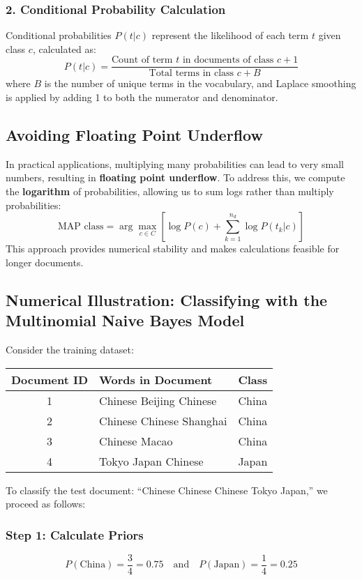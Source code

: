 \documentclass{article}
\begin{document}
\subsubsection*{2. Conditional Probability Calculation}
Conditional probabilities \( P(t|c) \) represent the likelihood of each term \( t \) given class \( c \), calculated as:
\[
P(t|c) = \frac{\text{Count of term } t \text{ in documents of class } c + 1}{\text{Total terms in class } c + B}
\]
where \( B \) is the number of unique terms in the vocabulary, and Laplace smoothing is applied by adding 1 to both the numerator and denominator.

\subsection*{Avoiding Floating Point Underflow}
In practical applications, multiplying many probabilities can lead to very small numbers, resulting in \textbf{floating point underflow}. To address this, we compute the \textbf{logarithm} of probabilities, allowing us to sum logs rather than multiply probabilities:
\[
\text{MAP class} = \arg \max_{c \in C} \left[ \log P(c) + \sum_{k=1}^{n_d} \log P(t_k|c) \right]
\]
This approach provides numerical stability and makes calculations feasible for longer documents.

\subsection*{Numerical Illustration: Classifying with the Multinomial Naive Bayes Model}

Consider the training dataset:

\begin{table}[h]
\centering
\begin{tabular}{|c|l|c|}
\hline
\textbf{Document ID} & \textbf{Words in Document} & \textbf{Class} \\
\hline
1 & Chinese Beijing Chinese & China \\
2 & Chinese Chinese Shanghai & China \\
3 & Chinese Macao & China \\
4 & Tokyo Japan Chinese & Japan \\
\hline
\end{tabular}
\end{table}

To classify the test document: ``Chinese Chinese Chinese Tokyo Japan,'' we proceed as follows:

\subsubsection*{Step 1: Calculate Priors}
\[
P(\text{China}) = \frac{3}{4} = 0.75 \quad \text{and} \quad P(\text{Japan}) = \frac{1}{4} = 0.25
\]
\end{document}
